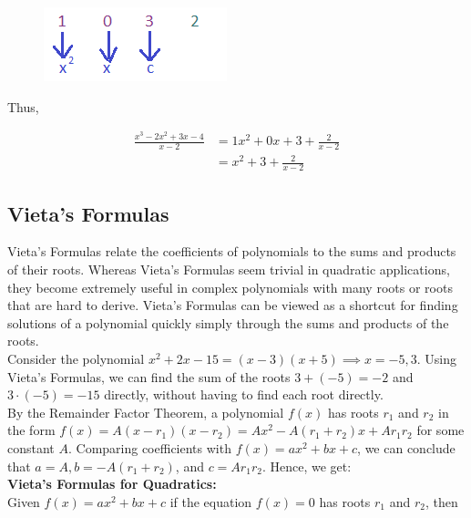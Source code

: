 \documentclass{article}
\begin{document}
    \begin{figure} [hbt!]
        \centering
        \includegraphics [scale = 0.5] {Resources/Unit3Polynomials/synthdiv6.png}
    \end{figure}

    \noindent Thus,

    \begin{align*}
        \frac{x^3-2x^2+3x-4}{x-2} &= 1x^2+0x+3+\frac{2}{x-2} \\
        &= x^2+3+\frac{2}{x-2}
    \end{align*}

    \subsection{Vieta's Formulas}

    Vieta’s Formulas relate the coefficients of polynomials to the sums and products of their
    roots. Whereas Vieta’s Formulas seem trivial in quadratic applications, they become
    extremely useful in complex polynomials with many roots or roots that are hard to derive.
    Vieta’s Formulas can be viewed as a shortcut for finding solutions of a polynomial quickly
    simply through the sums and products of the roots. \\

    \noindent Consider the polynomial $x^2+2x-15=(x-3)(x+5) \implies x=-5,3$. Using Vieta's
    Formulas, we can find the sum of the roots $3+(-5)=-2$ and $3\cdot(-5)=-15$ directly,
    without having to find each root directly. \\

    \noindent By the Remainder Factor Theorem, a polynomial $f(x)$ has roots $r_1$ and $r_2$
    in the form $f(x)=A(x-r_1)(x-r_2)=Ax^2-A(r_1+r_2)x+Ar_1 r_2$ for some constant $A$.
    Comparing coefficients with $f(x) = ax^2+bx+c$, we can conclude that $a=A, b=-A(r_1+r_2)$,
    and $c=Ar_1 r_2$. Hence, we get: \\

    \noindent \color{purple} \textbf{Vieta's Formulas for Quadratics:} \color{black} \\
    \noindent Given $f(x) = ax^2+bx+c$ if the equation $f(x)=0$ has roots $r_1$ and $r_2$, then
\end{document}
